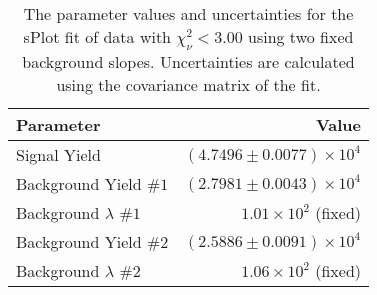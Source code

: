
\begin{table}[ht]
    \begin{center}
        \begin{tabular}{lr}\toprule
            Parameter & Value \\\midrule
            Signal Yield & $(4.7496 \pm 0.0077) \times 10^{4}$ \\
            Background Yield $\#1$ & $(2.7981 \pm 0.0043) \times 10^{4}$ \\
            Background $\lambda$ $\#1$ & $1.01 \times 10^{2}$ (fixed) \\
            Background Yield $\#2$ & $(2.5886 \pm 0.0091) \times 10^{4}$ \\
            Background $\lambda$ $\#2$ & $1.06 \times 10^{2}$ (fixed) \\\bottomrule
        \end{tabular}
        \caption{The parameter values and uncertainties for the sPlot fit of data with $\chi^2_\nu < 3.00$ using two fixed background slopes. Uncertainties are calculated using the covariance matrix of the fit.}\label{tab:splot-fit-results-chisqdof-3.00-fixed-2}
    \end{center}
\end{table}
